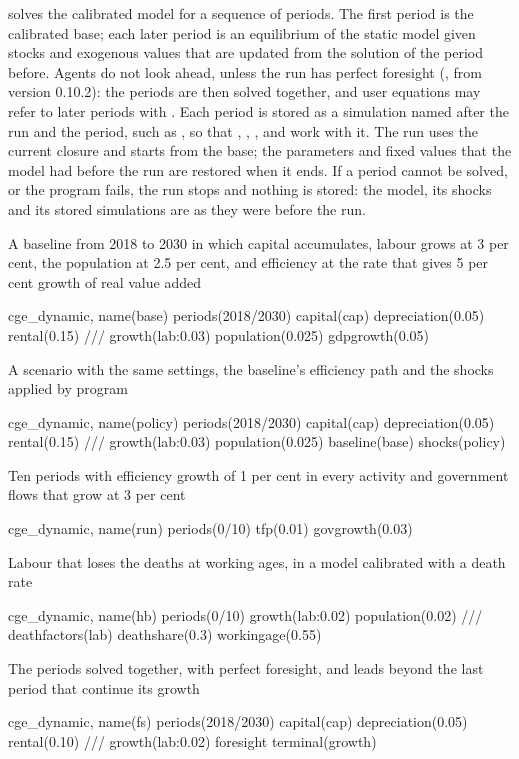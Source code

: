 

 solves the calibrated model for a sequence of periods. The
first period is the calibrated base; each later period is an equilibrium of
the static model given stocks and exogenous values that are updated from the
solution of the period before. Agents do not look ahead, unless the run has
perfect foresight (, from version 0.10.2): the periods are
then solved together, and user equations may refer to later periods with
. Each period is
stored as a simulation named after the run and the period, such as
, so that , ,
,  and  work with it.
The run uses the current closure and starts from the base; the parameters and
fixed values that the model had before the run are restored when it ends.
If a period cannot be solved, or the  program fails, the run
stops and nothing is stored: the model, its shocks and its stored simulations
are as they were before the run.


A baseline from 2018 to 2030 in which capital accumulates, labour grows at 3
per cent, the population at 2.5 per cent, and efficiency at the rate that
gives 5 per cent growth of real value added
\begin{stcode}
cge_dynamic, name(base) periods(2018/2030) capital(cap) depreciation(0.05) rental(0.15) ///
    growth(lab:0.03) population(0.025) gdpgrowth(0.05)
\end{stcode}
A scenario with the same settings, the baseline's efficiency path and the
shocks applied by program 
\begin{stcode}
cge_dynamic, name(policy) periods(2018/2030) capital(cap) depreciation(0.05) rental(0.15) ///
    growth(lab:0.03) population(0.025) baseline(base) shocks(policy)
\end{stcode}
Ten periods with efficiency growth of 1 per cent in every activity and
government flows that grow at 3 per cent
\begin{stcode}
cge_dynamic, name(run) periods(0/10) tfp(0.01) govgrowth(0.03)
\end{stcode}
Labour that loses the deaths at working ages, in a model calibrated with a
death rate
\begin{stcode}
cge_dynamic, name(hb) periods(0/10) growth(lab:0.02) population(0.02) ///
    deathfactors(lab) deathshare(0.3) workingage(0.55)
\end{stcode}
The periods solved together, with perfect foresight, and leads beyond the last
period that continue its growth
\begin{stcode}
cge_dynamic, name(fs) periods(2018/2030) capital(cap) depreciation(0.05) rental(0.10) ///
    growth(lab:0.02) foresight terminal(growth)
\end{stcode}

